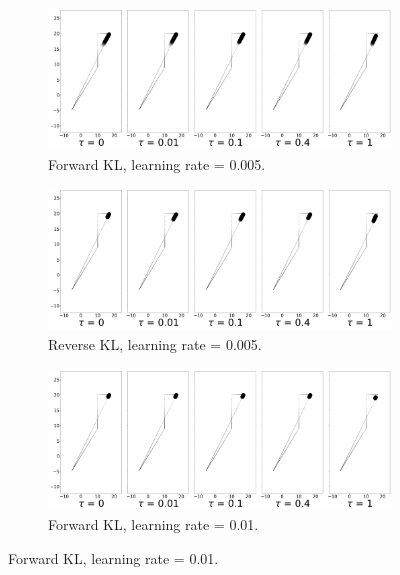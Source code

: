 \documentclass[\main/thesis.tex]{subfiles}
\begin{document}
\begin{figure}[!htb]
  \centering
  \begin{subfigure}[b]{0.85\linewidth}
    \centering
    \includegraphics[width=0.8\columnwidth]{figs/switch-stay/notlearnQ/polytope_forward_optim=rmsprop_lr=[0.005].png}
    \caption{Forward KL, learning rate = 0.005.}
    \label{fig:discrete-switch-stay-forward-adam0.005}
  \end{subfigure}
  
  \begin{subfigure}[b]{0.85\linewidth}
        \centering
        \includegraphics[width=0.8\columnwidth]{figs/switch-stay/notlearnQ/polytope_reverse_optim=rmsprop_lr=[0.005].png}
        \caption{Reverse KL, learning rate = 0.005.}
        \label{fig:discrete-switch-stay-reverse-adam0.005}
  \end{subfigure}
  
  \begin{subfigure}[b]{0.85\linewidth}
    \centering
    \includegraphics[width=0.8\columnwidth]{figs/switch-stay/notlearnQ/polytope_forward_optim=rmsprop_lr=[0.01].png}
    \caption{Forward KL, learning rate = 0.01.}
    \label{fig:discrete-switch-stay-forward-adam0.01}
  \end{subfigure}
  

\end{figure}
\end{document}
